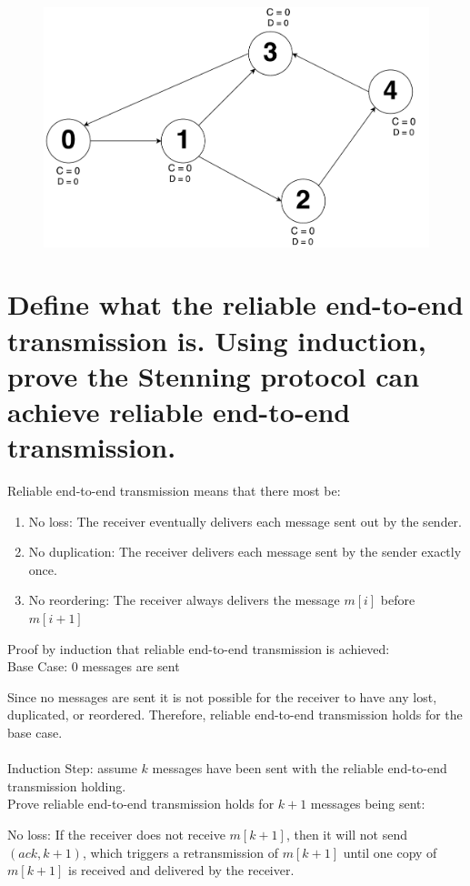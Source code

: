 \documentclass[times]{article}
\begin{document}
		\begin{figure}[H]
			\includegraphics[width=\linewidth]{q2/10.pdf}
		\end{figure}
	\pagebreak
	\section{Define what the reliable end-to-end transmission is. Using induction, prove the Stenning protocol can achieve reliable end-to-end transmission.}
		Reliable end-to-end transmission means that there most be:
		\begin{enumerate}
			\item No loss: The receiver eventually delivers each message sent out by the sender.
			\item No duplication: The receiver delivers each message sent by the sender exactly once.
			\item No reordering: The receiver always delivers the message $m[i]$ before $m[i+1]$
		\end{enumerate}
		Proof by induction that reliable end-to-end transmission is achieved:\\
		Base Case: 0 messages are sent
		
		Since no messages are sent it is not possible for the receiver to have any lost, duplicated, or reordered. Therefore, reliable end-to-end transmission holds for the base case.\\\\
		Induction Step: assume $k$ messages have been sent with the reliable end-to-end transmission holding.\\		
		Prove reliable end-to-end transmission holds for $k+1$ messages being sent:
		
		No loss: If the receiver does not receive $m[k+1]$, then it will not send $(ack, k+1)$, which triggers a retransmission of $m[k+1]$ until one copy of $m[k+1]$ is received and delivered by the receiver.
		
\end{document}

